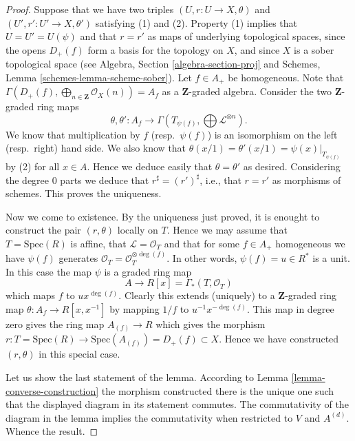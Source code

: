 \begin{proof}
Suppose that we have two triples $(U, r : U \to X, \theta)$
and $(U', r' : U' \to X, \theta')$ satisfying (1) and (2).
Property (1) implies that $U = U' = U(\psi)$ and that
$r = r'$ as maps of underlying topological
spaces, since the opens $D_{+}(f)$ form a basis for the topology
on $X$, and since $X$ is a sober topological space (see
Algebra, Section \ref{algebra-section-proj}
and
Schemes, Lemma \ref{schemes-lemma-scheme-sober}).
Let $f \in A_{+}$ be homogeneous. Note that
$\Gamma(D_{+}(f), \bigoplus_{n \in \mathbf{Z}} \mathcal{O}_X(n)) = A_f$
as a $\mathbf{Z}$-graded algebra. Consider the two
$\mathbf{Z}$-graded ring maps
$$
\theta, \theta' :
A_f
\longrightarrow
\Gamma(T_{\psi(f)}, \bigoplus \mathcal{L}^{\otimes n}).
$$
We know that multiplication by $f$ (resp.\ $\psi(f)$)
is an isomorphism on the left (resp.\ right) hand side.
We also know that $\theta(x/1) = \theta'(x/1) = \psi(x)|_{T_{\psi(f)}}$
by (2) for all $x \in A$. Hence we deduce easily that $\theta = \theta'$
as desired. Considering the degree $0$ parts we deduce that
$r^\sharp = (r')^\sharp$, i.e., that $r = r'$ as morphisms of schemes.
This proves the uniqueness.

\medskip\noindent
Now we come to existence. By the uniqueness just proved, it is enought to
construct the pair $(r, \theta)$ locally on $T$. Hence we may assume
that $T = \text{Spec}(R)$ is affine, that $\mathcal{L} = \mathcal{O}_T$
and that for some $f \in A_{+}$ homogeneous we have
$\psi(f)$ generates $\mathcal{O}_T = \mathcal{O}_T^{\otimes \deg(f)}$.
In other words, $\psi(f) = u \in R^*$ is a unit. In this case the map
$\psi$ is a graded ring map
$$
A \longrightarrow R[x] = \Gamma_*(T, \mathcal{O}_T)
$$
which maps $f$ to $ux^{\deg(f)}$. Clearly this extends (uniquely) to
a $\mathbf{Z}$-graded ring map $\theta : A_f \to R[x, x^{-1}]$ by
mapping $1/f$ to $u^{-1}x^{-\deg(f)}$. This map in degree zero gives
the ring map $A_{(f)} \to R$ which gives the morphism
$r : T = \text{Spec}(R) \to \text{Spec}(A_{(f)}) = D_{+}(f) \subset X$.
Hence we have constructed $(r, \theta)$ in this special case.

\medskip\noindent
Let us show the last statement of the lemma.
According to Lemma \ref{lemma-converse-construction}
the morphism constructed there is the unique one such that
the displayed diagram in its statement commutes.
The commutativity of the diagram in the lemma implies the
commutativity when restricted to $V$ and $A^{(d)}$.
Whence the result.
\end{proof}

